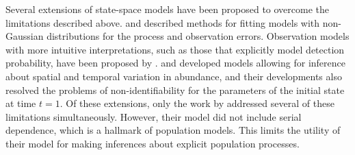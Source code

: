 \documentclass[12pt]{article}
\begin{document}
Several extensions of state-space models have been proposed to
overcome the limitations described above. \citet{devalpine_hastings:2002} and
\citet{kery_etal:2009} described methods for fitting models with non-Gaussian
distributions for the process and observation errors. Observation models with
more intuitive interpretations, such as those that explicitly model
detection probability, have been proposed by \citet{kery_etal:2009}. \citet{lele_etal:1998} and
\citet{kery_etal:2009} developed models allowing for inference about
spatial and temporal variation in abundance, and their developments
also resolved the problems of non-identifiability for the parameters
of the initial state at time $t=1$. Of these extensions, only
the work by \citet{kery_etal:2009} addressed several of these limitations
simultaneously. However, their model did not include serial
dependence, which is a hallmark of population models. This
limits the utility of their model for making inferences about explicit
population processes.
\end{document}
